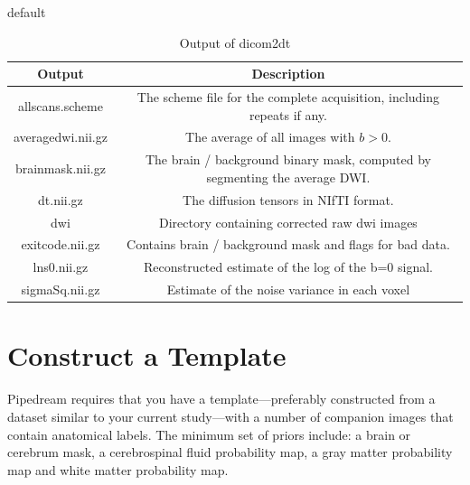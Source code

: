 \documentclass{InsightArticle}
\begin{document}

\begin{table}[htdp]
\caption{default}
\begin{center}
\begin{tabular}{|c|c|}
\hline
\textbf{Output} & \textbf{Description} \\ \hline
allscans.scheme & The scheme file for the complete acquisition, including repeats if any. \\ \hline
averagedwi.nii.gz & The average of all images with $b > 0$. \\ \hline
brainmask.nii.gz & The brain / background binary mask, computed by segmenting the average DWI. \\ \hline
dt.nii.gz         & The diffusion tensors in NIfTI format. \\ \hline
dwi               & Directory containing corrected raw dwi images \\ \hline
exitcode.nii.gz   & Contains brain / background mask and flags for bad data. \\ \hline
lns0.nii.gz       & Reconstructed estimate of the log of the b=0 signal. \\ \hline
sigmaSq.nii.gz    & Estimate of the noise variance in each voxel \\ \hline
\end{tabular}
\end{center}
\label{dicom2dtout}
\caption{Output of dicom2dt}
\end{table}%


\section{Construct a Template}
Pipedream requires that you have a template---preferably constructed
from a dataset similar to your current study---with a number of
companion images that contain anatomical labels.  The minimum set of
priors include: a brain or cerebrum mask, a cerebrospinal fluid
probability map, a gray matter probability map and white matter
probability map.
\end{document}
